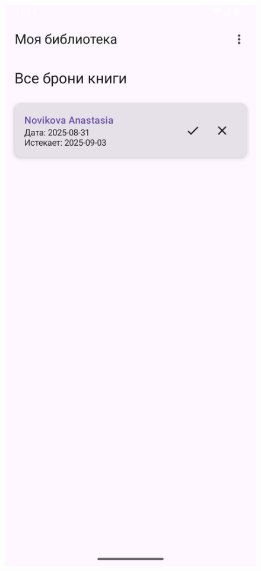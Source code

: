 \begin{figure}[H]
	\centering
	\includegraphics[scale=0.125]{img/reservation_list.png}

\end{figure}
